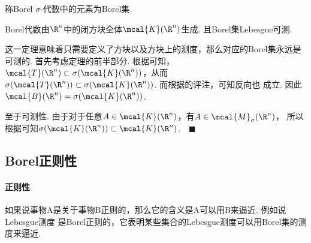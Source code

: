   \begin{defi}[Borel集]
    称Borel $\sigma$-代数中的元素为Borel集.
  \end{defi}

  \begin{thm}
    Borel代数由$\R^n$中的闭方块全体$\mcal{K}(\R^n)$生成. 且Borel集Lebesgue可测.
  \end{thm}
  \remark
    这一定理意味着只需要定义了方块以及方块上的测度，那么对应的Borel集永远是可测的.
  \proof
    首先考虑定理的前半部分. 根据可知，$\mcal{T}(\R^n)
    \subset\sigma(\mcal{K}(\R^n))$，从而$\sigma(\mcal{T}(\R^n))\subset
    \sigma(\mcal{K}(\R^n))$. 而根据的评注，可知反向也
    成立. 因此$\mcal{B}(\R^n) = \sigma(\mcal{K}(\R^n))$.\par
    至于可测性. 由于对于任意$A\in\mcal{K}(\R^n)$，有$A\in\mcal{M}_\sigma(\R^n)$，
    所以根据可知$\sigma(\mcal{K}(\R^n))\subset
    \mcal{K}(\R^n)$.$\quad\blacksquare$

\subsection{Borel正则性}

  \paragraph{正则性}
    如果说事物A是关于事物B正则的，那么它的含义是A可以用B来逼近. 例如说Lebesgue测度
    是Borel正则的，它表明某些集合的Lebesgue测度可以用Borel集的测度来逼近.

